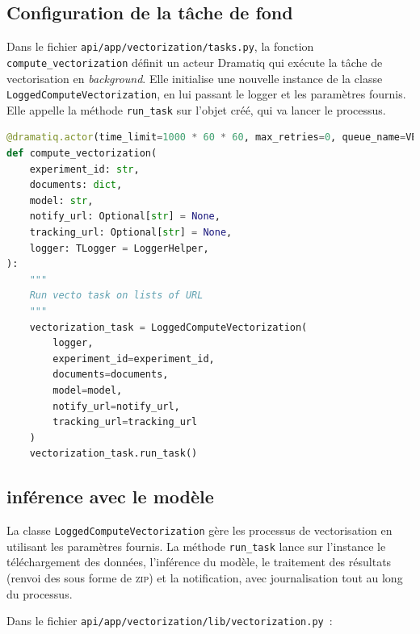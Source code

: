  \subsection{Configuration de la tâche de fond}

Dans le fichier \texttt{api/app/vectorization/tasks.py}, la fonction \texttt{compute\_vectorization} définit un acteur Dramatiq qui exécute la tâche de vectorisation en \textit{background}. Elle initialise une nouvelle instance de la classe \texttt{LoggedComputeVectorization}, en lui passant le logger et les paramètres fournis. Elle appelle la méthode \texttt{run\_task} sur l'objet créé, qui va lancer le processus. 

 \begin{lstlisting}[language=python, frame=single, breaklines=true, caption={Tâche \texttt{dramatiq} \texttt{compute\_vectorization}.}]
@dramatiq.actor(time_limit=1000 * 60 * 60, max_retries=0, queue_name=VEC_QUEUE)
def compute_vectorization(
    experiment_id: str,
    documents: dict,
    model: str,
    notify_url: Optional[str] = None,
    tracking_url: Optional[str] = None,
    logger: TLogger = LoggerHelper,
):
    """
    Run vecto task on lists of URL
    """
    vectorization_task = LoggedComputeVectorization(
        logger,
        experiment_id=experiment_id,
        documents=documents,
        model=model,
        notify_url=notify_url,
        tracking_url=tracking_url
    )
    vectorization_task.run_task()

	\end{lstlisting}

 \subsection{inférence avec le modèle}

La classe \texttt{LoggedComputeVectorization} gère les processus de vectorisation en utilisant les paramètres fournis. La méthode \texttt{run\_task} lance sur l'instance le téléchargement des données, l'inférence du modèle, le traitement des résultats (renvoi des \svgs sous forme de \textsc{zip}) et la notification, avec journalisation tout au long du processus.

Dans le fichier \texttt{api/app/vectorization/lib/vectorization.py}~: 

